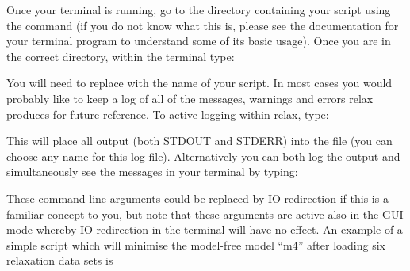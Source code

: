 Once your terminal is running, go to the directory containing your script using the  command (if you do not know what this is, please see the documentation for your terminal program to understand some of its basic usage).
Once you are in the correct directory, within the terminal type:


You will need to replace  with the name of your script.
In most cases you would probably like to keep a log of all of the messages, warnings and errors relax produces for future reference.
To active logging within relax, type:


This will place all output (both STDOUT and STDERR) into the  file (you can choose any name for this log file).
Alternatively you can both log the output and simultaneously see the messages in your terminal by typing:


These command line arguments could be replaced by IO redirection if this is a familiar concept to you, but note that these arguments are active also in the GUI mode whereby IO redirection in the terminal will have no effect.
An example of a simple script which will minimise the model-free model ``m4'' after loading six relaxation data sets is

